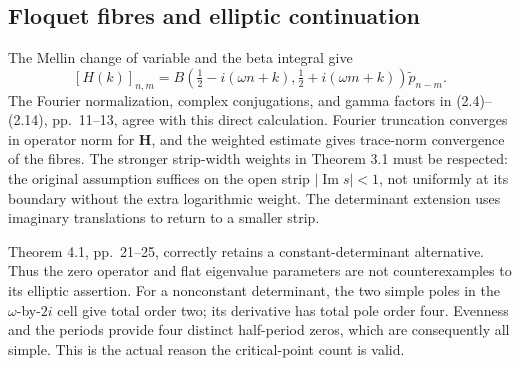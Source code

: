 \documentclass[10pt]{article}
\begin{document}
\subsection*{Floquet fibres and elliptic continuation}
The Mellin change of variable and the beta integral give \[[H(k)]_{n,m}
 =B\!\left(\tfrac12-i(\omega n+k),\tfrac12+i(\omega m+k)\right)
       \widetilde p_{n-m}.\] The Fourier normalization, complex conjugations, and gamma factors in (2.4)–(2.14), pp. 11–13, agree with this direct calculation. Fourier truncation converges in operator norm for \(\mathbf H\), and the weighted estimate gives trace-norm convergence of the fibres. The stronger strip-width weights in Theorem 3.1 must be respected: the original assumption suffices on the open strip \(|\operatorname{Im}s|<1\), not uniformly at its boundary without the extra logarithmic weight. The determinant extension uses imaginary translations to return to a smaller strip.\par
Theorem 4.1, pp. 21–25, correctly retains a constant-determinant alternative. Thus the zero operator and flat eigenvalue parameters are not counterexamples to its elliptic assertion. For a nonconstant determinant, the two simple poles in the \(\omega\)-by-\(2i\) cell give total order two; its derivative has total pole order four. Evenness and the periods provide four distinct half-period zeros, which are consequently all simple. This is the actual reason the critical-point count is valid.\par
\end{document}

